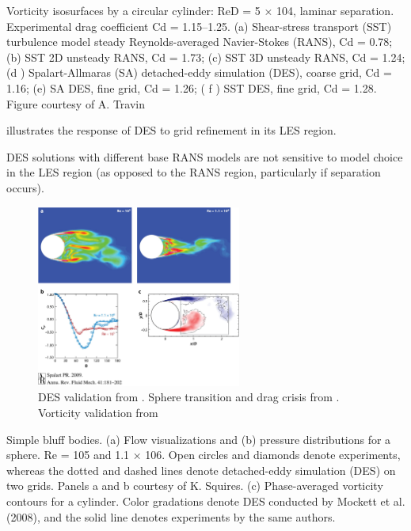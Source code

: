 \documentclass[journal]{new-aiaa}
\begin{document}
Vorticity isosurfaces by a circular cylinder: ReD = 5 × 104, laminar separation. Experimental drag
coefficient Cd = 1.15–1.25. (a) Shear-stress transport (SST) turbulence model steady Reynolds-averaged
Navier-Stokes (RANS), Cd = 0.78; (b) SST 2D unsteady RANS, Cd = 1.73; (c) SST 3D unsteady RANS,
Cd = 1.24; (d ) Spalart-Allmaras (SA) detached-eddy simulation (DES), coarse grid, Cd = 1.16; (e) SA DES,
fine grid, Cd = 1.26; ( f ) SST DES, fine grid, Cd = 1.28. Figure courtesy of A. Travin



illustrates the response of DES to grid refinement in its LES region.

DES solutions with different base RANS models are not sensitive to
model choice in the LES region (as opposed to the RANS region, particularly if separation occurs).





\begin{figure}[H]
\begin{center}
\includegraphics[width=0.6\textwidth]{Images/logan/spalart2009detachededdy_SphereSeparation.jpeg}
\caption{ DES validation from \cite{spalart2009detachededdy}. Sphere transition and drag crisis from \cite{squires2004detachededdy}.  Vorticity validation from \cite{mockett2008demonstration} }
\label{fig:desspherevalidation}
\end{center}
\end{figure}

Simple bluff bodies. (a) Flow visualizations and (b) pressure distributions for a sphere. Re = 105 and 1.1 × 106. Open circles and
diamonds denote experiments, whereas the dotted and dashed lines denote detached-eddy simulation (DES) on two grids. Panels a and
b courtesy of K. Squires. (c) Phase-averaged vorticity contours for a cylinder. Color gradations denote DES conducted by Mockett et al.
(2008), and the solid line denotes experiments by the same authors.
\end{document}
